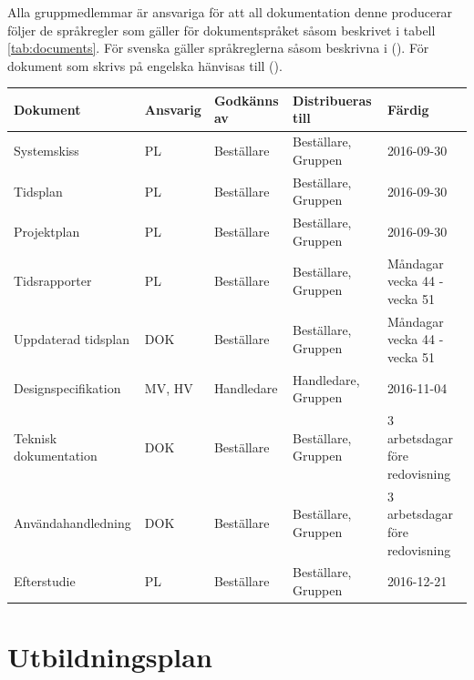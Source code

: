 \documentclass[a4paper,11pt]{article}
\begin{document}
Alla gruppmedlemmar är ansvariga för att all dokumentation denne producerar följer de språkregler som gäller för dokumentspråket såsom beskrivet i tabell \ref{tab:documents}. För svenska gäller språkreglerna såsom beskrivna i  (\cite{Sprakradet2008}). För dokument som skrivs på engelska hänvisas till  (\cite{Ritter2003}).


\label{tab:documents}
\begin{flushleft}
    \begin{tabular}{|L{90pt}|L{40pt} |L{60pt} |L{100pt} |L{100pt} |}
    	\hline
    	Dokument              & Ansvarig & Godkänns av & Distribueras till   & Färdig                         \\ \hline
    	Systemskiss           & PL       & Beställare  & Beställare, Gruppen & 2016-09-30                     \\ \hline
    	Tidsplan              & PL       & Beställare  & Beställare, Gruppen & 2016-09-30                     \\ \hline
    	Projektplan           & PL       & Beställare  & Beställare, Gruppen & 2016-09-30                     \\ \hline
    	Tidsrapporter         & PL      & Beställare  & Beställare, Gruppen & Måndagar vecka 44 - vecka 51   \\ \hline
    	Uppdaterad tidsplan   & DOK      & Beställare  & Beställare, Gruppen & Måndagar vecka 44 - vecka 51   \\ \hline
    	Designspecifikation   & MV, HV   & Handledare  & Handledare, Gruppen & 2016-11-04                     \\ \hline
    	Teknisk dokumentation & DOK      & Beställare  & Beställare, Gruppen & 3 arbetsdagar före redovisning \\ \hline
    	Användahandledning    & DOK      & Beställare  & Beställare, Gruppen & 3 arbetsdagar före redovisning \\ \hline
    	Efterstudie           & PL       & Beställare  & Beställare, Gruppen & 2016-12-21                     \\ \hline
    \end{tabular}
\end{flushleft}

\section{Utbildningsplan}
\end{document}
